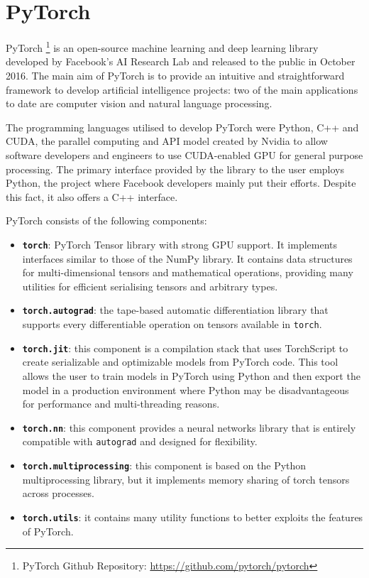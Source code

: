 \section{PyTorch}

PyTorch \footnote{PyTorch Github Repository: \href{https://github.com/pytorch/pytorch}{https://github.com/pytorch/pytorch}} \cite{paszke2017automatic}  is an open-source machine learning and deep learning library developed by Facebook's AI Research Lab and released to the public in October 2016. The main aim of PyTorch is to provide an intuitive and straightforward framework to develop artificial intelligence projects: two of the main applications to date are computer vision and natural language processing.

The programming languages utilised to develop PyTorch were Python, C++ and CUDA, the parallel computing and API model created by Nvidia to allow software developers and engineers to use CUDA-enabled GPU for general purpose processing. The primary interface provided by the library to the user employs Python, the project where Facebook developers mainly put their efforts. Despite this fact, it also offers a C++ interface.

PyTorch consists of the following components:
\begin{itemize}
	\item \textbf{\texttt{torch}}: PyTorch Tensor library with strong GPU support. It implements interfaces similar to those of the NumPy library. It contains data structures for multi-dimensional tensors and mathematical operations, providing many utilities for efficient serialising tensors and arbitrary types.
	\item \textbf{\texttt{torch.autograd}}: the tape-based automatic differentiation library that supports every differentiable operation on tensors available in \texttt{torch}.
	\item \textbf{\texttt{torch.jit}}: this component is a compilation stack that uses TorchScript to create serializable and optimizable models from PyTorch code. This tool allows the user to train models in PyTorch using Python and then export the model in a production environment where Python may be disadvantageous for performance and multi-threading reasons.
	\item \textbf{\texttt{torch.nn}}: this component provides a neural networks library that is entirely compatible with \texttt{autograd} and designed for flexibility.
	\item \textbf{\texttt{torch.multiprocessing}}: this component is based on the Python multiprocessing library, but it implements memory sharing of torch tensors across processes.
	\item \textbf{\texttt{torch.utils}}: it contains many utility functions to better exploits the features of PyTorch.
\end{itemize}

